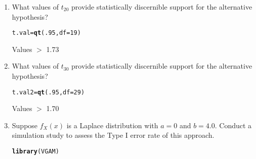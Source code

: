 \documentclass{article}\usepackage[]{graphicx}\usepackage[]{xcolor}
\makeatletter
\newcommand{\hlnum}[1]{\textcolor[rgb]{0.686,0.059,0.569}{#1}}%
\newcommand{\hldef}[1]{\textcolor[rgb]{0.345,0.345,0.345}{#1}}%
\newcommand{\hlkwb}[1]{\textcolor[rgb]{0.69,0.353,0.396}{#1}}%
\newcommand{\hlkwc}[1]{\textcolor[rgb]{0.333,0.667,0.333}{#1}}%
\newcommand{\hlkwd}[1]{\textcolor[rgb]{0.737,0.353,0.396}{\textbf{#1}}}%
\newenvironment{kframe}{%
 \def\at@end@of@kframe{}%
 \ifinner\ifhmode%
  \def\at@end@of@kframe{\end{minipage}}%
  \begin{minipage}{\columnwidth}%
 \fi\fi%
 \def\FrameCommand##1{\hskip\@totalleftmargin \hskip-\fboxsep
 \colorbox{shadecolor}{##1}\hskip-\fboxsep
     \hskip-\linewidth \hskip-\@totalleftmargin \hskip\columnwidth}%
 \MakeFramed {\advance\hsize-\width
   \@totalleftmargin\z@ \linewidth\hsize
   \@setminipage}}%
 {\par\unskip\endMakeFramed%
 \at@end@of@kframe}
\newenvironment{knitrout}{}{} %
\makeatother
\begin{document}
\begin{enumerate}
\begin{enumerate}
  \item What values of $t_{20}$ provide statistically discernible support for the
  alternative hypothesis?
\begin{knitrout}\scriptsize
{}\color{fgcolor}\begin{kframe}
\begin{alltt}
\hldef{t.val} \hlkwb{=} \hlkwd{qt}\hldef{(}\hlnum{.95}\hldef{,} \hlkwc{df} \hldef{=} \hlnum{19}\hldef{)}
\end{alltt}
\end{kframe}
\end{knitrout}
  Values $>$ 1.73
  \item What values of $t_{30}$ provide statistically discernible support for the
  alternative hypothesis?
\begin{knitrout}\scriptsize
{}\color{fgcolor}\begin{kframe}
\begin{alltt}
 \hldef{t.val2} \hlkwb{=} \hlkwd{qt}\hldef{(}\hlnum{.95}\hldef{,} \hlkwc{df} \hldef{=} \hlnum{29}\hldef{)}
\end{alltt}
\end{kframe}
\end{knitrout}
  Values $>$ 1.70
  \item Suppose $f_X(x)$ is a Laplace distribution with $a=0$ and $b=4.0$.
  Conduct a simulation study to assess the Type I error rate of this approach.\\
\begin{knitrout}\scriptsize
{}\color{fgcolor}\begin{kframe}
\begin{alltt}
 \hlkwd{library}\hldef{(VGAM)}
\end{alltt}


{\ttfamily\noindent\itshape\color{messagecolor}{\#\# Loading required package: stats4}}


\end{kframe}
\end{knitrout}
\end{enumerate}
\end{enumerate}
\end{document}
